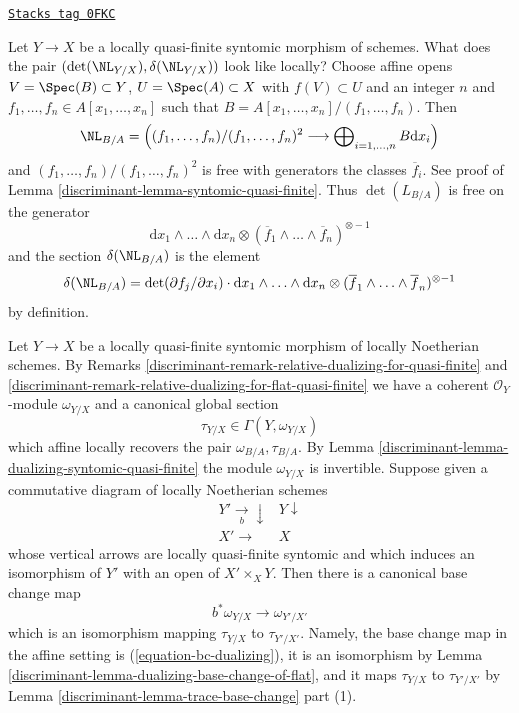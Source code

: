 \begin{remark}
\label{discriminant-remark-local-description-delta}
\href{https://stacks.math.columbia.edu/tag/0FKC}{\texttt{Stacks tag 0FKC}}

Let $Y \to X$ be a locally quasi-finite syntomic morphism of schemes.
What does the pair $(\det(\NL_{Y/X}), \delta(\NL_{Y/X}))$ look
like locally? Choose affine opens $V = \Spec(B) \subset Y$,
$U = \Spec(A) \subset X$ with $f(V) \subset U$ and an integer $n$ and
$f_1, \ldots, f_n \in A[x_1, \ldots, x_n]$ such that
$B = A[x_1, \ldots, x_n]/(f_1, \ldots, f_n)$. Then
$$
\NL_{B/A} = \left(
(f_1, \ldots, f_n)/(f_1, \ldots, f_n)^2
\longrightarrow
\bigoplus\nolimits_{i = 1, \ldots, n} B \text{d} x_i\right)
$$
and $(f_1, \ldots, f_n)/(f_1, \ldots, f_n)^2$ is free with generators
the classes $\overline{f}_i$. See proof of
Lemma \ref{discriminant-lemma-syntomic-quasi-finite}.
Thus $\det(L_{B/A})$ is free on the generator
$$
\text{d}x_1 \wedge \ldots \wedge \text{d}x_n
\otimes
(\overline{f}_1 \wedge \ldots \wedge \overline{f}_n)^{\otimes -1}
$$
and the section $\delta(\NL_{B/A})$ is the element
$$
\delta(\NL_{B/A}) =
\det(\partial f_j/ \partial x_i) \cdot
\text{d}x_1 \wedge \ldots \wedge \text{d}x_n
\otimes
(\overline{f}_1 \wedge \ldots \wedge \overline{f}_n)^{\otimes -1}
$$
by definition.
\end{remark}

Let $Y \to X$ be a locally quasi-finite syntomic morphism of
locally Noetherian schemes. By
Remarks \ref{discriminant-remark-relative-dualizing-for-quasi-finite} and
\ref{discriminant-remark-relative-dualizing-for-flat-quasi-finite} we have
a coherent $\mathcal{O}_Y$-module $\omega_{Y/X}$ and a canonical
global section
$$
\tau_{Y/X} \in \Gamma(Y, \omega_{Y/X})
$$
which affine locally recovers the pair $\omega_{B/A}, \tau_{B/A}$.
By Lemma \ref{discriminant-lemma-dualizing-syntomic-quasi-finite} the module
$\omega_{Y/X}$ is invertible. Suppose given a commutative diagram of
locally Noetherian schemes
$$
\begin{array}{cc}Y' \underset{b}{\longrightarrow}\downarrow & Y \downarrow \\ X' \longrightarrow & X\end{array}
$$
whose vertical arrows are locally quasi-finite syntomic and which
induces an isomorphism of $Y'$ with an open of $X' \times_X Y$.
Then there is a canonical base change map
$$
b^*\omega_{Y/X} \longrightarrow \omega_{Y'/X'}
$$
which is an isomorphism
mapping $\tau_{Y/X}$ to $\tau_{Y'/X'}$. Namely, the base change map
in the affine setting is (\ref{equation-bc-dualizing}), it is an
isomorphism by Lemma \ref{discriminant-lemma-dualizing-base-change-of-flat}, and it
maps $\tau_{Y/X}$ to $\tau_{Y'/X'}$ by
Lemma \ref{discriminant-lemma-trace-base-change} part (1).

